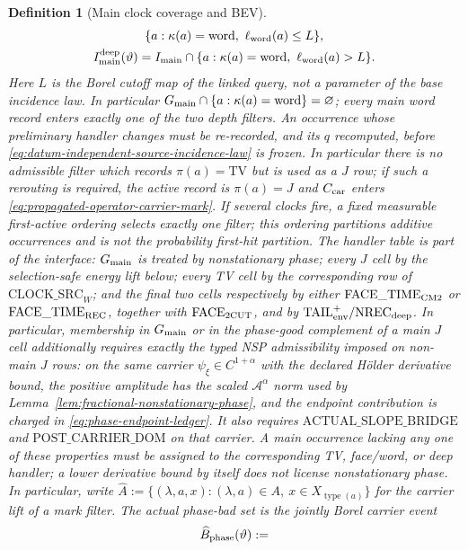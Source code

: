 \documentclass[11pt]{article}
\newtheorem{definition}[theorem]{Definition}
\begin{document}
\begin{definition}[Main clock coverage and BEV]
\begin{equation}
\begin{gathered}
      \{a:\kappa(a)={\rm word},\ \ell_{\rm word}(a)\le L\},\\
 I_{\rm main}^{\rm deep}(\vartheta)
   = I_{\rm main}\cap
      \{a:\kappa(a)={\rm word},\ \ell_{\rm word}(a)>L\}.
\end{gathered}
\end{equation}
Here $L$ is the Borel cutoff map of the linked query, not a parameter of the
base incidence law.  In particular
$G_{\rm main}\cap\{a:\kappa(a)={\rm word}\}=\varnothing$; every main word
record enters exactly one of the two depth filters.  An occurrence whose preliminary handler changes must
be re-recorded, and its $q$ recomputed, before
\eqref{eq:datum-independent-source-incidence-law} is frozen.  In particular
there is no admissible filter which records $\pi(a)=\mathrm{TV}$ but is used
as a $J$ row; if such a rerouting is required, the active record is
$\pi(a)=J$ and $C_{\rm car}$ enters
\eqref{eq:propagated-operator-carrier-mark}.
If several clocks fire, a fixed measurable first-active ordering selects
exactly one filter; this ordering partitions additive occurrences and is not
the probability first-hit partition.  The handler table is part of the
interface: $G_{\rm main}$ is treated by nonstationary phase; every $J$ cell
by the selection-safe energy lift below; every TV cell by the corresponding
row of $\mathrm{CLOCK\_SRC}_{W}$; and the final two cells respectively by
either $\mathrm{FACE\_TIME}_{\rm CM2}$ or
$\mathrm{FACE\_TIME}_{\rm REC}$, together with
$\mathrm{FACE}_{\rm 2CUT}$, and by
$\mathrm{TAIL}_{\rm env}^{+}/\mathrm{NREC}_{\rm deep}$.  In particular,
membership in $G_{\rm main}$ or in the phase-good complement of a main
$J$ cell additionally requires exactly the typed NSP admissibility imposed
on non-main $J$ rows: on the same carrier
$\psi_\xi\in C^{1+\alpha}$ with the declared H\"older derivative bound, the
positive amplitude has the scaled $\mathcal A^\alpha$ norm used by
Lemma~\ref{lem:fractional-nonstationary-phase}, and the endpoint contribution
is charged in \eqref{eq:phase-endpoint-ledger}.  It also requires
$\mathrm{ACTUAL\_SLOPE\_BRIDGE}$ and
$\mathrm{POST\_CARRIER\_DOM}$ on that carrier.  A main occurrence lacking
any one of these properties must be assigned to the corresponding TV,
face/word, or deep handler; a lower derivative bound by itself does not
license nonstationary phase.  In particular,
write $\widehat A:=\{(\lambda,a,x):(\lambda,a)\in A,\
x\in X_{\operatorname{type}(a)}\}$ for the carrier lift of a mark filter.
The actual phase-bad set is the jointly Borel carrier event
\[
 \widehat B_{\rm phase}(\vartheta):=
\]
\end{definition}
\end{document}
